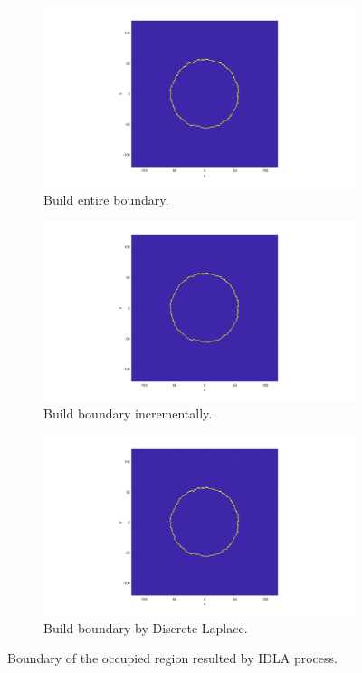 \documentclass[letterpaper]{article}
\numberwithin{equation}{section} %
\numberwithin{figure}{section} %
\numberwithin{table}{section} %
\begin{document}
\begin{figure}[htbp]
	\centering
	\begin{subfigure}[b]{0.3\textwidth}
		\includegraphics[width=\textwidth]{3bdry1}
		\caption{Build entire boundary.}
		\label{3bdry1}
	\end{subfigure}
	\begin{subfigure}[b]{0.3\textwidth}
		\includegraphics[width=\textwidth]{3bdry2}
		\caption{Build boundary incrementally.}
		\label{3bdry2}
	\end{subfigure}
	\begin{subfigure}[b]{0.3\textwidth}
		\includegraphics[width=\textwidth]{3bdry3}
		\caption{Build boundary by Discrete Laplace.}
		\label{3bdry3}
	\end{subfigure}
	\caption{Boundary of the occupied region resulted by IDLA process.}
	\label{3bdry}
\end{figure}
\end{document}
